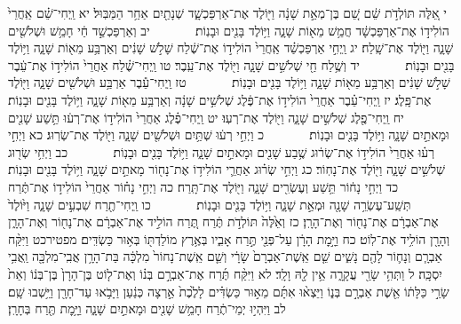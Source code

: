 \documentclass[twoside, openany, parskip=half, 11pt]{book}
\begin{document}
י אֵ֚לֶּה תּוֹלְדֹ֣ת שֵׁ֔ם שֵׁ֚ם בֶּן־מְאַ֣ת שָׁנָ֔ה וַיּ֖וֹלֶד אֶת־אַרְפַּכְשָׁ֑ד שְׁנָתַ֖יִם אַחַ֥ר הַמַּבּֽוּל׃ יא וַֽיְחִי־שֵׁ֗ם אַֽחֲרֵי֙ הוֹלִיד֣וֹ אֶת־אַרְפַּכְשָׁ֔ד חֲמֵ֥שׁ מֵא֖וֹת שָׁנָ֑ה וַיּ֥וֹלֶד בָּנִ֖ים וּבָנֽוֹת׃
　　　 יב וְאַרְפַּכְשַׁ֣ד חַ֔י חָמֵ֥שׁ וּשְׁלֹשִׁ֖ים שָׁנָ֑ה וַיּ֖וֹלֶד אֶת־שָֽׁלַח׃ יג וַֽיְחִ֣י אַרְפַּכְשַׁ֗ד אַֽחֲרֵי֙ הוֹלִיד֣וֹ אֶת־שֶׁ֔לַח שָׁלֹ֣שׁ שָׁנִ֔ים וְאַרְבַּ֥ע מֵא֖וֹת שָׁנָ֑ה וַיּ֥וֹלֶד בָּנִ֖ים וּבָנֽוֹת׃
　　　 יד וְשֶׁ֥לַח חַ֖י שְׁלֹשִׁ֣ים שָׁנָ֑ה וַיּ֖וֹלֶד אֶת־עֵֽבֶר׃ טו וַֽיְחִי־שֶׁ֗לַח אַחֲרֵי֙ הוֹלִיד֣וֹ אֶת־עֵ֔בֶר שָׁלֹ֣שׁ שָׁנִ֔ים וְאַרְבַּ֥ע מֵא֖וֹת שָׁנָ֑ה וַיּ֥וֹלֶד בָּנִ֖ים וּבָנֽוֹת׃
　　　 טז וַֽיְחִי־עֵ֕בֶר אַרְבַּ֥ע וּשְׁלֹשִׁ֖ים שָׁנָ֑ה וַיּ֖וֹלֶד אֶת־פָּֽלֶג׃ יז וַֽיְחִי־עֵ֗בֶר אַחֲרֵי֙ הוֹלִיד֣וֹ אֶת־פֶּ֔לֶג שְׁלֹשִׁ֣ים שָׁנָ֔ה וְאַרְבַּ֥ע מֵא֖וֹת שָׁנָ֑ה וַיּ֥וֹלֶד בָּנִ֖ים וּבָנֽוֹת׃
　　　 יח וַֽיְחִי־פֶ֖לֶג שְׁלֹשִׁ֣ים שָׁנָ֑ה וַיּ֖וֹלֶד אֶת־רְעֽוּ׃ יט וַֽיְחִי־פֶ֗לֶג אַחֲרֵי֙ הוֹלִיד֣וֹ אֶת־רְע֔וּ תֵּ֥שַׁע שָׁנִ֖ים וּמָאתַ֣יִם שָׁנָ֑ה וַיּ֥וֹלֶד בָּנִ֖ים וּבָנֽוֹת׃
　　　 כ וַיְחִ֣י רְע֔וּ שְׁתַּ֥יִם וּשְׁלֹשִׁ֖ים שָׁנָ֑ה וַיּ֖וֹלֶד אֶת־שְׂרֽוּג׃ כא וַיְחִ֣י רְע֗וּ אַחֲרֵי֙ הוֹלִיד֣וֹ אֶת־שְׂר֔וּג שֶׁ֥בַע שָׁנִ֖ים וּמָאתַ֣יִם שָׁנָ֑ה וַיּ֥וֹלֶד בָּנִ֖ים וּבָנֽוֹת׃
　　　 כב וַיְחִ֥י שְׂר֖וּג שְׁלֹשִׁ֣ים שָׁנָ֑ה וַיּ֖וֹלֶד אֶת־נָחֽוֹר׃ כג וַיְחִ֣י שְׂר֗וּג אַחֲרֵ֛י הוֹלִיד֥וֹ אֶת־נָח֖וֹר מָאתַ֣יִם שָׁנָ֑ה וַיּ֥וֹלֶד בָּנִ֖ים וּבָנֽוֹת׃
　　　 כד וַיְחִ֣י נָח֔וֹר תֵּ֥שַׁע וְעֶשְׂרִ֖ים שָׁנָ֑ה וַיּ֖וֹלֶד אֶת־תָּֽרַח׃ כה וַיְחִ֣י נָח֗וֹר אַחֲרֵי֙ הוֹלִיד֣וֹ אֶת־תֶּ֔רַח תְּשַֽׁע־עֶשְׂרֵ֥ה שָׁנָ֖ה וּמְאַ֣ת שָׁנָ֑ה וַיּ֥וֹלֶד בָּנִ֖ים וּבָנֽוֹת׃
　　　 כו וַֽיְחִי־תֶ֖רַח שִׁבְעִ֣ים שָׁנָ֑ה וַיּ֙וֹלֶד֙ אֶת־אַבְרָ֔ם אֶת־נָח֖וֹר וְאֶת־הָרָֽן׃ כז וְאֵ֙לֶּה֙ תּוֹלְדֹ֣ת תֶּ֔רַח תֶּ֚רַח הוֹלִ֣יד אֶת־אַבְרָ֔ם אֶת־נָח֖וֹר וְאֶת־הָרָ֑ן וְהָרָ֖ן הוֹלִ֥יד אֶת־לֽוֹט׃ כח וַיָּ֣מׇת הָרָ֔ן עַל־פְּנֵ֖י תֶּ֣רַח אָבִ֑יו בְּאֶ֥רֶץ מוֹלַדְתּ֖וֹ בְּא֥וּר כַּשְׂדִּֽים׃ מפטירכט וַיִּקַּ֨ח אַבְרָ֧ם וְנָח֛וֹר לָהֶ֖ם נָשִׁ֑ים שֵׁ֤ם אֵֽשֶׁת־אַבְרָם֙ שָׂרָ֔י וְשֵׁ֤ם אֵֽשֶׁת־נָחוֹר֙ מִלְכָּ֔ה בַּת־הָרָ֥ן אֲבִֽי־מִלְכָּ֖ה וַֽאֲבִ֥י יִסְכָּֽה׃ ל וַתְּהִ֥י שָׂרַ֖י עֲקָרָ֑ה אֵ֥ין לָ֖הּ וָלָֽד׃ לא וַיִּקַּ֨ח תֶּ֜רַח אֶת־אַבְרָ֣ם בְּנ֗וֹ וְאֶת־ל֤וֹט בֶּן־הָרָן֙ בֶּן־בְּנ֔וֹ וְאֵת֙ שָׂרַ֣י כַּלָּת֔וֹ אֵ֖שֶׁת אַבְרָ֣ם בְּנ֑וֹ וַיֵּצְא֨וּ אִתָּ֜ם מֵא֣וּר כַּשְׂדִּ֗ים לָלֶ֙כֶת֙ אַ֣רְצָה כְּנַ֔עַן וַיָּבֹ֥אוּ עַד־חָרָ֖ן וַיֵּ֥שְׁבוּ שָֽׁם׃ לב וַיִּהְי֣וּ יְמֵי־תֶ֔רַח חָמֵ֥שׁ שָׁנִ֖ים וּמָאתַ֣יִם שָׁנָ֑ה וַיָּ֥מׇת תֶּ֖רַח בְּחָרָֽן׃
\end{document}
